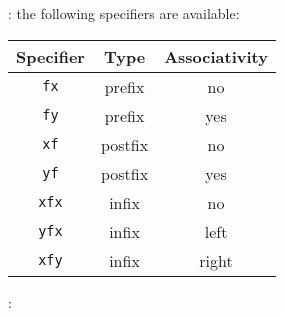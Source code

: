 : the following specifiers are available:

\begin{tabular}{|c|c|c|}
\hline

Specifier & Type & Associativity \\

\hline\hline

\texttt{fx} & prefix & no \\

\hline

\texttt{fy} & prefix & yes \\

\hline

\texttt{xf} & postfix & no \\

\hline

\texttt{yf} & postfix & yes \\

\hline

\texttt{xfx} & infix & no \\

\hline

\texttt{yfx} & infix & left \\

\hline

\texttt{xfy} & infix & right \\

\hline
\end{tabular}

:

